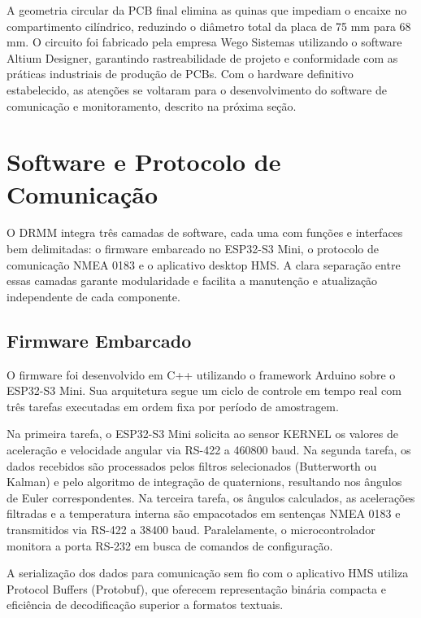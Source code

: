 \documentclass[a4paper, 12pt]{article}
\begin{document}
    A geometria circular da PCB final elimina as quinas que impediam o encaixe no compartimento cilíndrico, reduzindo o diâmetro total da placa de 75 mm para 68 mm. O circuito foi fabricado pela empresa Wego Sistemas utilizando o software Altium Designer, garantindo rastreabilidade de projeto e conformidade com as práticas industriais de produção de PCBs. Com o hardware definitivo estabelecido, as atenções se voltaram para o desenvolvimento do software de comunicação e monitoramento, descrito na próxima seção.


\newpage
\section{Software e Protocolo de Comunicação}

O DRMM integra três camadas de software, cada uma com funções e interfaces bem delimitadas: o firmware embarcado no ESP32-S3 Mini, o protocolo de comunicação NMEA 0183 e o aplicativo desktop HMS. A clara separação entre essas camadas garante modularidade e facilita a manutenção e atualização independente de cada componente.

\subsection{Firmware Embarcado}

    O firmware foi desenvolvido em C++ utilizando o framework Arduino sobre o ESP32-S3 Mini. Sua arquitetura segue um ciclo de controle em tempo real com três tarefas executadas em ordem fixa por período de amostragem.

    Na primeira tarefa, o ESP32-S3 Mini solicita ao sensor KERNEL os valores de aceleração e velocidade angular via RS-422 a 460800 baud. Na segunda tarefa, os dados recebidos são processados pelos filtros selecionados (Butterworth ou Kalman) e pelo algoritmo de integração de quaternions, resultando nos ângulos de Euler correspondentes. Na terceira tarefa, os ângulos calculados, as acelerações filtradas e a temperatura interna são empacotados em sentenças NMEA 0183 e transmitidos via RS-422 a 38400 baud. Paralelamente, o microcontrolador monitora a porta RS-232 em busca de comandos de configuração.

    A serialização dos dados para comunicação sem fio com o aplicativo HMS utiliza Protocol Buffers (Protobuf), que oferecem representação binária compacta e eficiência de decodificação superior a formatos textuais.
\end{document}
